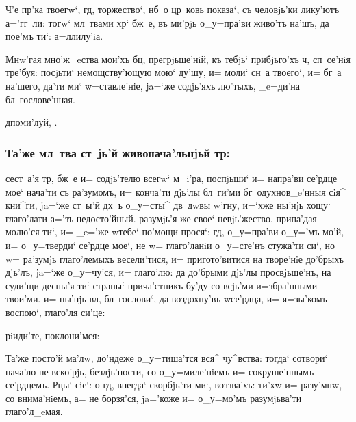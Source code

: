 \documentclass[12pt,twoside,a6paper,xdvi,civil=antiqua]{hipbook}
\begin{document}
 Ч'е пр'ка твоегw`, гд, торжество`,
нб~о цр~ковь показа`, съ человjь'ки ли\-ку'\-ютъ а='гг~ли: тогw`
мл~твами хр` бж~е, въ ми'рjь о_у=пра'ви живо'тъ на'шъ, да пое'мъ
ти`: а=ллилу'iа.

 Мнw'гая мно'ж_eства мои'хъ бц,
прегрjьше'нiй, къ тебjь` прибjьго'хъ ч, сп~се'\-нiя тре'\-буя:
посjьти` не\-мощ\-ст\-ву'\-ю\-щую мою` ду'шу, и= моли` сн~а твоего`,
и= бг~а на'\-ше\-го, да'ти ми` w=став\-ле'\-нiе, ja=`же содjь'яхъ
лю'\-тыхъ, _e=ди'на бл~гослове'нная.

\baselineskip
\centerline{д поми'луй, .}
\baselineskip

\centerline{}

\subsubsection{Та'же мл~тва ст~jь'й живонача'льнjьй тр:}

сест~а'я тр, бж~е и= содjь'телю всегw` м_i'\-ра, поспjьши`
и= напра'ви се'рдце мое` нача'ти съ ра'\-зу\-момъ, и= конча'ти дjь'лы
бл~ги'ми бг~о\-духнов_e'нныя сiя^ кни^ги, ja=`же ст~ы'й дх~ъ
о_у=с\-ты^ дв~дwвы w'гну, и=`хже ны'нjь хощу` гла\-го'\-ла\-ти
а='зъ недосто'йный. разумjь'я же свое` невjь'жество, припа'дая молю'ся
ти`, и= _e='же w\т тебе` по'мощи прося`: гд, о_у=пра'ви о_у='мъ
мо'й, и= о_у=тверди` се'рдце мое`, не w= гла\-го'\-ла\-нiи о_у=сте'нъ
стужа'ти си`, но w= ра'\-зумjь гла\-го'\-ле\-мыхъ весели'тися, и=
при\-го\-то'\-ви\-ти\-ся на творе'нiе до'брыхъ дjь'лъ, ja=`же
о_у=чу'ся, и= глаго'лю: да до'брыми дjь'лы просвjьще'нъ, на суди'щи
десны'я ти` страны` при\-ча'ст\-никъ бу'\-ду со всjь'ми и=збра'нными
твои'ми. и= ны'нjь вл, бл~гослови`, да воздохну'въ w\т се'рдца, и=
я=зы'комъ воспою`, глаго'ля си'це:

\begin{center}
  рiиди'те, поклони'мся: 
\end{center}

{\small \color[named]{Red} Та'же посто'й ма'лw, до'ндеже о_у=тиша'тся вся^
  чу^вст\-ва: тогда` сотвори` нача'ло не вско'рjь, без\ъ лjь'ности, со
  о_у=миле'нiемъ и= сокруше'ннымъ се'рдцемъ. Рцы` сiе`: {\color[named]{Black}
    \normalfont{}о гд, внегда` скорбjь'ти ми`, воззва'хъ:}
  ти'хw и= разу'мнw, со внима'нiемъ, а= не борзя'ся, ja='коже и= о_у=мо'мъ
  разумjьва'ти гла\-го'\-л_e\-мая.}
\end{document}
